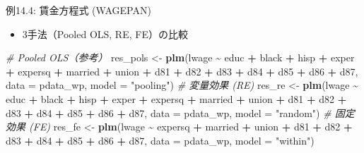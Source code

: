 \documentclass[
  ignorenonframetext,
]{beamer}
\newenvironment{Shaded}{\begin{snugshade}}{\end{snugshade}}
\newcommand{\AttributeTok}[1]{\textcolor[rgb]{0.13,0.29,0.53}{#1}}
\newcommand{\CommentTok}[1]{\textcolor[rgb]{0.56,0.35,0.01}{\textit{#1}}}
\newcommand{\FunctionTok}[1]{\textcolor[rgb]{0.13,0.29,0.53}{\textbf{#1}}}
\newcommand{\NormalTok}[1]{#1}
\newcommand{\OtherTok}[1]{\textcolor[rgb]{0.56,0.35,0.01}{#1}}
\newcommand{\SpecialCharTok}[1]{\textcolor[rgb]{0.81,0.36,0.00}{\textbf{#1}}}
\newcommand{\StringTok}[1]{\textcolor[rgb]{0.31,0.60,0.02}{#1}}
\providecommand{\tightlist}{%
  \setlength{\itemsep}{0pt}\setlength{\parskip}{0pt}}
\begin{document}
\begin{frame}[fragile]{例14.4: 賃金方程式 (WAGEPAN)}
\label{ux4f8b14.4-ux8cc3ux91d1ux65b9ux7a0bux5f0f-wagepan}
\begin{itemize}
\tightlist
\item
  3手法（Pooled OLS, RE, FE）の比較
\end{itemize}

\footnotesize

\begin{Shaded}
\begin{Highlighting}[]
\CommentTok{\# Pooled OLS（参考）}
\NormalTok{res\_pols }\OtherTok{\textless{}{-}} \FunctionTok{plm}\NormalTok{(lwage }\SpecialCharTok{\textasciitilde{}}\NormalTok{ educ }\SpecialCharTok{+}\NormalTok{ black }\SpecialCharTok{+}\NormalTok{ hisp }\SpecialCharTok{+}\NormalTok{ exper }\SpecialCharTok{+}\NormalTok{ expersq }\SpecialCharTok{+}
\NormalTok{                  married }\SpecialCharTok{+}\NormalTok{ union }\SpecialCharTok{+}
\NormalTok{                  d81 }\SpecialCharTok{+}\NormalTok{ d82 }\SpecialCharTok{+}\NormalTok{ d83 }\SpecialCharTok{+}\NormalTok{ d84 }\SpecialCharTok{+}\NormalTok{ d85 }\SpecialCharTok{+}\NormalTok{ d86 }\SpecialCharTok{+}\NormalTok{ d87,}
                \AttributeTok{data =}\NormalTok{ pdata\_wp, }\AttributeTok{model =} \StringTok{"pooling"}\NormalTok{)}
\CommentTok{\# 変量効果 (RE)}
\NormalTok{res\_re }\OtherTok{\textless{}{-}} \FunctionTok{plm}\NormalTok{(lwage }\SpecialCharTok{\textasciitilde{}}\NormalTok{ educ }\SpecialCharTok{+}\NormalTok{ black }\SpecialCharTok{+}\NormalTok{ hisp }\SpecialCharTok{+}\NormalTok{ exper }\SpecialCharTok{+}\NormalTok{ expersq }\SpecialCharTok{+}
\NormalTok{                married }\SpecialCharTok{+}\NormalTok{ union }\SpecialCharTok{+}
\NormalTok{                d81 }\SpecialCharTok{+}\NormalTok{ d82 }\SpecialCharTok{+}\NormalTok{ d83 }\SpecialCharTok{+}\NormalTok{ d84 }\SpecialCharTok{+}\NormalTok{ d85 }\SpecialCharTok{+}\NormalTok{ d86 }\SpecialCharTok{+}\NormalTok{ d87,}
              \AttributeTok{data =}\NormalTok{ pdata\_wp, }\AttributeTok{model =} \StringTok{"random"}\NormalTok{)}
\CommentTok{\# 固定効果 (FE)}
\NormalTok{res\_fe }\OtherTok{\textless{}{-}} \FunctionTok{plm}\NormalTok{(lwage }\SpecialCharTok{\textasciitilde{}}\NormalTok{ expersq }\SpecialCharTok{+}\NormalTok{ married }\SpecialCharTok{+}\NormalTok{ union }\SpecialCharTok{+}
\NormalTok{                d81 }\SpecialCharTok{+}\NormalTok{ d82 }\SpecialCharTok{+}\NormalTok{ d83 }\SpecialCharTok{+}\NormalTok{ d84 }\SpecialCharTok{+}\NormalTok{ d85 }\SpecialCharTok{+}\NormalTok{ d86 }\SpecialCharTok{+}\NormalTok{ d87,}
              \AttributeTok{data =}\NormalTok{ pdata\_wp, }\AttributeTok{model =} \StringTok{"within"}\NormalTok{)}
\end{Highlighting}
\end{Shaded}

\normalsize
\end{frame}
\end{document}
